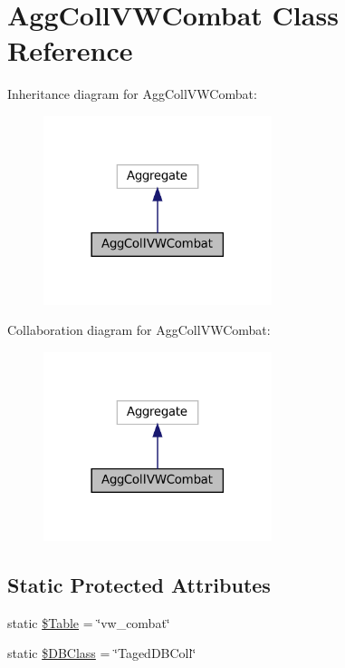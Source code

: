 \hypertarget{class_agg_coll_v_w_combat}{}\section{Agg\+Coll\+V\+W\+Combat Class Reference}
\label{class_agg_coll_v_w_combat}


Inheritance diagram for Agg\+Coll\+V\+W\+Combat\+:\nopagebreak
\begin{figure}[H]
\begin{center}
\leavevmode
\includegraphics[width=189pt]{class_agg_coll_v_w_combat__inherit__graph}
\end{center}
\end{figure}


Collaboration diagram for Agg\+Coll\+V\+W\+Combat\+:\nopagebreak
\begin{figure}[H]
\begin{center}
\leavevmode
\includegraphics[width=189pt]{class_agg_coll_v_w_combat__coll__graph}
\end{center}
\end{figure}
\subsection*{Static Protected Attributes}
\begin{DoxyCompactItemize}
\item 
static \hyperlink{class_agg_coll_v_w_combat_ad281ccf2a886204c6a82a2c4142c9684}{\$\+Table} = \char`\"{}vw\+\_\+combat\char`\"{}
\item 
static \hyperlink{class_agg_coll_v_w_combat_a365efcf29c11cf286d1db372562a1f20}{\$\+D\+B\+Class} = \char`\"{}Taged\+D\+B\+Coll\char`\"{}
\end{DoxyCompactItemize}


